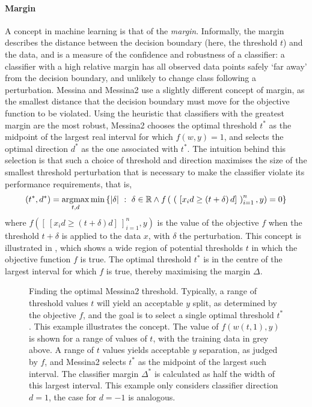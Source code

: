 \documentclass[dissertation.tex]{subfiles}
\begin{document}
\paragraph{Margin}
A concept in machine learning is that of the \emph{margin}.  Informally, the margin describes the distance between the decision boundary (here, the threshold $t$) and the data, and is a measure of the confidence and robustness of a classifier: a classifier with a high relative margin has all observed data points safely `far away' from the decision boundary, and unlikely to change class following a perturbation.  Messina and Messina2 use a slightly different concept of margin, as the smallest distance that the decision boundary must move for the objective function to be violated.  Using the heuristic that classifiers with the greatest margin are the most robust, Messina2 chooses the optimal threshold $t^*$ as the midpoint of the largest real interval for which $f(w, y) = 1$, and selects the optimal direction $d^*$ as the one associated with $t^*$.  The intuition behind this selection is that such a choice of threshold and direction maximises the size of the smallest threshold perturbation that is necessary to make the classifier violate its performance requirements, that is, 
\begin{equation*}
(t^*, d^*) = \operatorname*{\arg\!\max}_{t,d} \mathrm{min}\left\{ \vert\delta\vert~:~\delta \in \mathbb{R} \wedge f\left(~\left(~\left[x_i d \geq \left(t + \delta\right)d\right]~\right)_{i=1}^n, y\right) = 0 \right\}
\end{equation*}
where $f([~[x_i d \geq (t + \delta)d]~]_{i=1}^n, y)$ is the value of the objective $f$ when the threshold $t + \delta$ is applied to the data $x$, with $\delta$ the perturbation.  This concept is illustrated in , which shows a wide region of potential thresholds $t$ in which the objective function $f$ is true.  The optimal threshold $t^*$ is in the centre of the largest interval for which $f$ is true, thereby maximising the margin $\Delta$.

\begin{figure}[!htbp]
\centering
\def\svgwidth{\linewidth} 

\caption[Finding the optimal Messina2 threshold]{Finding the optimal Messina2 threshold.  Typically, a range of threshold values $t$ will yield an acceptable $y$ split, as determined by the objective $f$, and the goal is to select a single optimal threshold $t^*$.  This example illustrates the concept.  The value of $f(w(t,1),y)$ is shown for a range of values of $t$, with the training data in grey above.  A range of $t$ values yields acceptable $y$ separation, as judged by $f$, and Messina2 selects $t^*$ as the midpoint of the largest such interval.  The classifier margin $\Delta^*$ is calculated as half the width of this largest interval.  This example only considers classifier direction $d = 1$, the case for $d = -1$ is analogous.}\label{fig:mess-thresh-2}
\end{figure}
\end{document}
